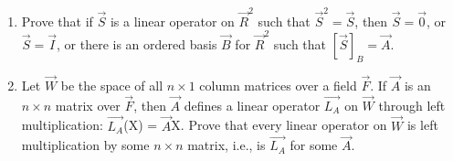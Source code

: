\begin{enumerate}[label=\thesubsection.\arabic*.,ref=\thesubsection.\theenumi]
\item Prove that if $\vec{S}$ is a linear operator on $\vec{R}^2$ such that $\vec{S}^2=\vec{S}$, 
then $\vec{S}=\vec{0}$, or $\vec{S}=\vec{I}$, or there is an ordered basis $\vec{B}$ for $\vec{R}^2$ 
such that $[\vec{S}]_B=\vec{A}$.
%
\\
\solution

%
\item Let $\vec{W}$ be the space of all $n \times 1$ column matrices over a field $\vec{F}$. If $\vec{A}$ is an $n \times n$ matrix over $\vec{F}$, then $\vec{A}$ defines a linear operator $\vec{L_{A}}$ on $\vec{W}$ through left multiplication: $\vec{L_{A}}$(X) = $\vec{A}$X. Prove that every linear operator on $\vec{W}$ is left multiplication by some $n\times n$ matrix, i.e., is $\vec{L_{A}}$ for some $\vec{A}$.


\end{enumerate}
